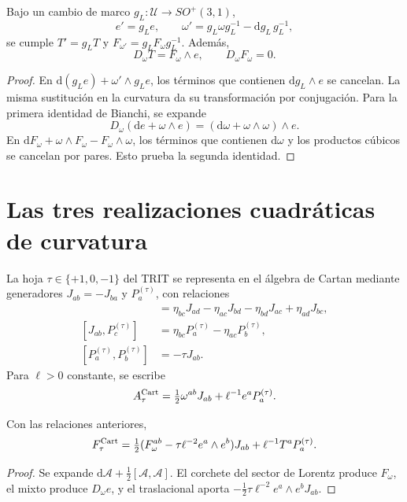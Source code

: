 \begin{proposition}
\label{x_reciprocidad:vii:prop:bianchi-cartan}
Bajo un cambio de marco \(g_L:\mathcal U\to SO^+(3,1)\),
\[
 e'=g_Le,\qquad
 \omega'=g_L\omega g_L^{-1}-\mathrm dg_L\,g_L^{-1},
\]
se cumple \(T'=g_LT\) y \(F_{\omega'}=g_LF_\omega g_L^{-1}\).
Además,
\begin{equation}
 D_\omega T=F_\omega\wedge e,\qquad D_\omega F_\omega=0.
 \label{x_reciprocidad:vii:eq:bianchi-realizacion}
\end{equation}
\end{proposition}
\begin{proof}
En \(\mathrm d(g_Le)+\omega'\wedge g_Le\), los términos
que contienen \(\mathrm dg_L\wedge e\) se cancelan.
La misma sustitución en la curvatura da su transformación por
conjugación. Para la primera identidad de Bianchi, se expande
\[
 D_\omega(\mathrm de+\omega\wedge e)
 =(\mathrm d\omega+\omega\wedge\omega)\wedge e.
\]
En \(\mathrm dF_\omega+\omega\wedge F_\omega-F_\omega\wedge\omega\),
los términos que contienen \(\mathrm d\omega\) y los productos
cúbicos se cancelan por pares. Esto prueba la segunda identidad.
\end{proof}

\section{Las tres realizaciones cuadráticas de curvatura}

La hoja \(\tau\in\{+1,0,-1\}\) del TRIT se representa en
el álgebra de Cartan mediante generadores \(J_{ab}=-J_{ba}\)
y \(P_a^{(\tau)}\), con relaciones
\begin{align*}
 [J_{ab},J_{cd}]&=
 \eta_{bc}J_{ad}-\eta_{ac}J_{bd}
 -\eta_{bd}J_{ac}+\eta_{ad}J_{bc},\\
 [J_{ab},P_c^{(\tau)}]&=
 \eta_{bc}P_a^{(\tau)}-\eta_{ac}P_b^{(\tau)},\\
 [P_a^{(\tau)},P_b^{(\tau)}]&=-\tau J_{ab}.
\end{align*}
Para \(\ell>0\) constante, se escribe
\[
 \mathcal A_\tau^{\rm Cart}
 =\tfrac12\omega^{ab}J_{ab}+\ell^{-1}e^aP_a^{(\tau)}.
\]

\begin{proposition}
\label{x_reciprocidad:vii:prop:curvatura-tritificada}
Con las relaciones anteriores,
\begin{equation}
 \mathcal F_\tau^{\rm Cart}
 =\tfrac12(F_\omega^{ab}-\tau\ell^{-2}e^a\wedge e^b)J_{ab}
     +\ell^{-1}T^aP_a^{(\tau)}.
 \label{x_reciprocidad:vii:eq:curvatura-tritificada}
\end{equation}
\end{proposition}
\begin{proof}
Se expande \(\mathrm d\mathcal A+\tfrac12[\mathcal A,\mathcal A]\).
El corchete del sector de Lorentz produce \(F_\omega\), el
mixto produce \(D_\omega e\), y el traslacional aporta
\(-\tfrac12\tau\ell^{-2}e^a\wedge e^bJ_{ab}\).
\end{proof}

